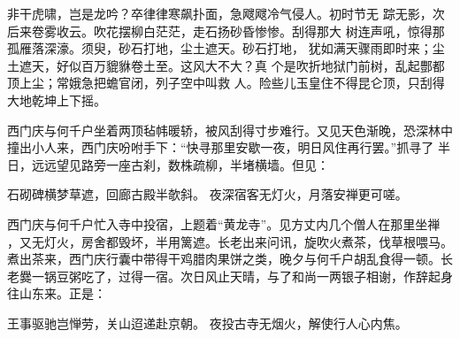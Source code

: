 非干虎啸，岂是龙吟？卒律律寒飙扑面，急飕飕冷气侵人。初时节无
踪无影，次后来卷雾收云。吹花摆柳白茫茫，走石扬砂昏惨惨。刮得那大
树连声吼，惊得那孤雁落深濠。须臾，砂石打地，尘土遮天。砂石打地，
犹如满天骤雨即时来；尘土遮天，好似百万貔貅卷土至。这风大不大？真
个是吹折地狱门前树，乱起酆都顶上尘；常娥急把蟾官闭，列子空中叫救
人。险些儿玉皇住不得昆仑顶，只刮得大地乾坤上下摇。

西门庆与何千户坐着两顶毡帏暖轿，被风刮得寸步难行。又见天色渐晚，恐深林中
撞出小人来，西门庆吩咐手下：“快寻那里安歇一夜，明日风住再行罢。”抓寻了
半日，远远望见路旁一座古刹，数株疏柳，半堵横墙。但见：

石砌碑横梦草遮，回廊古殿半欹斜。
夜深宿客无灯火，月落安禅更可嗟。

西门庆与何千户忙入寺中投宿，上题着“黄龙寺”。见方丈内几个僧人在那里坐禅
，又无灯火，房舍都毁坏，半用篱遮。长老出来问讯，旋吹火煮茶，伐草根喂马。
煮出茶来，西门庆行囊中带得干鸡腊肉果饼之类，晚夕与何千户胡乱食得一顿。长
老爨一锅豆粥吃了，过得一宿。次日风止天晴，与了和尚一两银子相谢，作辞起身
往山东来。正是：

王事驱驰岂惮劳，关山迢递赴京朝。
夜投古寺无烟火，解使行人心内焦。